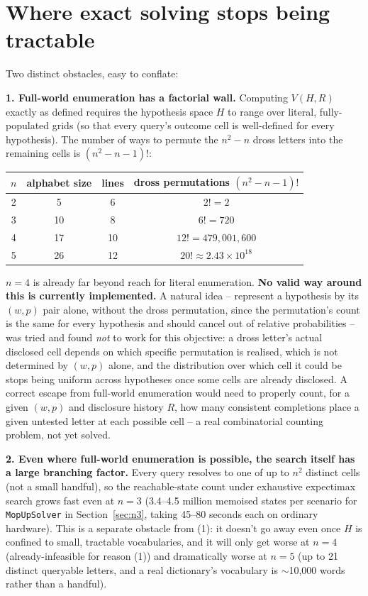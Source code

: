 \documentclass[11pt]{article}
\begin{document}
\section{Where exact solving stops being tractable}
\label{sec:tractability}

Two distinct obstacles, easy to conflate:

\textbf{1. Full-world enumeration has a factorial wall.} Computing
$V(H,R)$ exactly as defined requires the hypothesis space $H$ to range
over literal, fully-populated grids (so that every query's outcome cell
is well-defined for every hypothesis). The number of ways to permute the
$n^2-n$ dross letters into the remaining cells is $(n^2-n-1)!$:

\begin{center}
\begin{tabular}{cccc}
\toprule
$n$ & alphabet size & lines & dross permutations $(n^2-n-1)!$ \\
\midrule
2 & 5  & 6  & $2! = 2$ \\
3 & 10 & 8  & $6! = 720$ \\
4 & 17 & 10 & $12! = 479{,}001{,}600$ \\
5 & 26 & 12 & $20! \approx 2.43\times10^{18}$ \\
\bottomrule
\end{tabular}
\end{center}

$n=4$ is already far beyond reach for literal enumeration. \textbf{No
valid way around this is currently implemented.} A natural idea --
represent a hypothesis by its $(w,p)$ pair alone, without the dross
permutation, since the permutation's count is the same for every
hypothesis and should cancel out of relative probabilities -- was tried
and found \emph{not} to work for this objective: a dross letter's actual
disclosed cell depends on which specific permutation is realised, which
is not determined by $(w,p)$ alone, and the distribution over which cell
it could be stops being uniform across hypotheses once some cells are
already disclosed. A correct escape from full-world enumeration would
need to properly count, for a given $(w,p)$ and disclosure history $R$,
how many consistent completions place a given untested letter at each
possible cell -- a real combinatorial counting problem, not yet solved.

\textbf{2. Even where full-world enumeration is possible, the search
itself has a large branching factor.} Every query resolves to one of up
to $n^2$ distinct cells (not a small handful), so the reachable-state
count under exhaustive expectimax search grows fast even at $n=3$
(3.4--4.5 million memoised states per scenario for \texttt{MopUpSolver}
in Section~\ref{sec:n3}, taking 45--80 seconds each on ordinary
hardware). This is a separate obstacle from (1): it doesn't go away even
once $H$ is confined to small, tractable vocabularies, and it will only
get worse at $n=4$ (already-infeasible for reason (1)) and dramatically
worse at $n=5$ (up to 21 distinct queryable letters, and a real
dictionary's vocabulary is $\sim$10,000 words rather than a handful).
\end{document}
